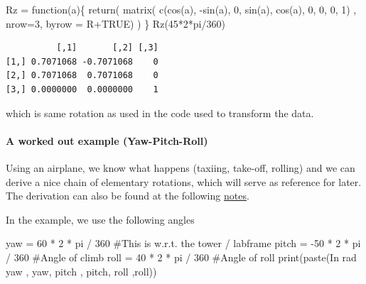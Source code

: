 \documentclass[
  letterpaper,
  DIV=11,
  numbers=noendperiod]{scrartcl}
\let\oldparagraph\paragraph
\renewcommand{\paragraph}[1]{\oldparagraph{#1}\mbox{}}
\newenvironment{Shaded}{\begin{snugshade}}{\end{snugshade}}
\newcommand{\AttributeTok}[1]{\textcolor[rgb]{0.40,0.45,0.13}{#1}}
\newcommand{\CommentTok}[1]{\textcolor[rgb]{0.37,0.37,0.37}{#1}}
\newcommand{\ConstantTok}[1]{\textcolor[rgb]{0.56,0.35,0.01}{#1}}
\newcommand{\ControlFlowTok}[1]{\textcolor[rgb]{0.00,0.23,0.31}{#1}}
\newcommand{\DecValTok}[1]{\textcolor[rgb]{0.68,0.00,0.00}{#1}}
\newcommand{\FunctionTok}[1]{\textcolor[rgb]{0.28,0.35,0.67}{#1}}
\newcommand{\NormalTok}[1]{\textcolor[rgb]{0.00,0.23,0.31}{#1}}
\newcommand{\OtherTok}[1]{\textcolor[rgb]{0.00,0.23,0.31}{#1}}
\newcommand{\SpecialCharTok}[1]{\textcolor[rgb]{0.37,0.37,0.37}{#1}}
\newcommand{\StringTok}[1]{\textcolor[rgb]{0.13,0.47,0.30}{#1}}
\begin{document}
\begin{Shaded}
\begin{Highlighting}[]
\NormalTok{Rz }\OtherTok{=} \ControlFlowTok{function}\NormalTok{(a)\{}
  \FunctionTok{return}\NormalTok{(}
    \FunctionTok{matrix}\NormalTok{(}
        \FunctionTok{c}\NormalTok{(}\FunctionTok{cos}\NormalTok{(a), }\SpecialCharTok{{-}}\FunctionTok{sin}\NormalTok{(a), }\DecValTok{0}\NormalTok{, }\FunctionTok{sin}\NormalTok{(a), }\FunctionTok{cos}\NormalTok{(a), }\DecValTok{0}\NormalTok{, }\DecValTok{0}\NormalTok{, }\DecValTok{0}\NormalTok{, }\DecValTok{1}\NormalTok{)}
\NormalTok{        , }\AttributeTok{nrow=}\DecValTok{3}\NormalTok{, }\AttributeTok{byrow =}\NormalTok{ R}\SpecialCharTok{+}\ConstantTok{TRUE}\NormalTok{) }
\NormalTok{  )}
\NormalTok{\}}
\FunctionTok{Rz}\NormalTok{(}\DecValTok{45}\SpecialCharTok{*}\DecValTok{2}\SpecialCharTok{*}\NormalTok{pi}\SpecialCharTok{/}\DecValTok{360}\NormalTok{)}
\end{Highlighting}
\end{Shaded}

\begin{verbatim}
          [,1]       [,2] [,3]
[1,] 0.7071068 -0.7071068    0
[2,] 0.7071068  0.7071068    0
[3,] 0.0000000  0.0000000    1
\end{verbatim}

which is same rotation as used in the code used to transform the data.

\hypertarget{a-worked-out-example-yaw-pitch-roll}{%
\paragraph{A worked out example
(Yaw-Pitch-Roll)}\label{a-worked-out-example-yaw-pitch-roll}}

Using an airplane, we know what happens (taxiing, take-off, rolling) and
we can derive a nice chain of elementary rotations, which will serve as
reference for later. The derivation can also be found at the following
\href{https://www.dropbox.com/s/n3oc5fjwrn1zaiu/Rotations\%20without\%20tears.pdf?dl=0}{notes}.

In the example, we use the following angles

\begin{Shaded}
\begin{Highlighting}[]
\NormalTok{yaw }\OtherTok{=} \DecValTok{60} \SpecialCharTok{*} \DecValTok{2} \SpecialCharTok{*}\NormalTok{ pi }\SpecialCharTok{/} \DecValTok{360}     \CommentTok{\#This is w.r.t. the tower / labframe}
\NormalTok{pitch }\OtherTok{=} \SpecialCharTok{{-}}\DecValTok{50} \SpecialCharTok{*} \DecValTok{2} \SpecialCharTok{*}\NormalTok{ pi }\SpecialCharTok{/} \DecValTok{360}  \CommentTok{\#Angle of climb}
\NormalTok{roll }\OtherTok{=} \DecValTok{40} \SpecialCharTok{*} \DecValTok{2} \SpecialCharTok{*}\NormalTok{ pi }\SpecialCharTok{/} \DecValTok{360}    \CommentTok{\#Angle of roll}
\FunctionTok{print}\NormalTok{(}\FunctionTok{paste}\NormalTok{(}\StringTok{\textquotesingle{}In rad yaw \textquotesingle{}}\NormalTok{, yaw, }\StringTok{\textquotesingle{} pitch \textquotesingle{}}\NormalTok{, pitch, }\StringTok{\textquotesingle{} roll \textquotesingle{}}\NormalTok{,roll))}
\end{Highlighting}
\end{Shaded}
\end{document}
